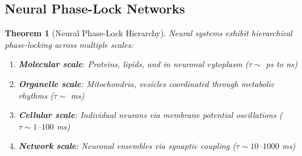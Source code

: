 \documentclass[12pt,a4paper]{article}
\newtheorem{theorem}{Theorem}
\begin{document}
\subsection{Neural Phase-Lock Networks}

\begin{theorem}[Neural Phase-Lock Hierarchy]
\label{thm:neural_phase_lock}
Neural systems exhibit hierarchical phase-locking across multiple scales:
\begin{enumerate}
\item \textbf{Molecular scale}: Proteins, lipids, and  in neuronal cytoplasm ($\tau \sim$ ps to ns)
\item \textbf{Organelle scale}: Mitochondria, vesicles coordinated through metabolic rhythms ($\tau \sim$ ms)
\item \textbf{Cellular scale}: Individual neurons via membrane potential oscillations ($\tau \sim 1$--$100$ ms)
\item \textbf{Network scale}: Neuronal ensembles via synaptic coupling ($\tau \sim 10$--$1000$ ms)
\end{enumerate}
\end{theorem}
\end{document}
